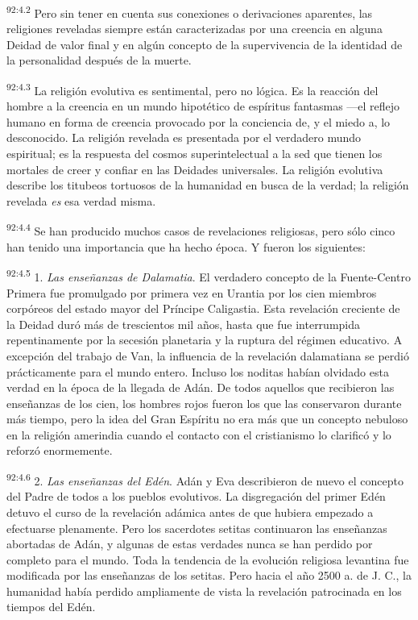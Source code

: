 \par
\textsuperscript{92:4.2} Pero sin tener en cuenta sus conexiones o derivaciones aparentes, las religiones reveladas siempre están caracterizadas por una creencia en alguna Deidad de valor final y en algún concepto de la supervivencia de la identidad de la personalidad después de la muerte.

\par
\textsuperscript{92:4.3} La religión evolutiva es sentimental, pero no lógica. Es la reacción del hombre a la creencia en un mundo hipotético de espíritus fantasmas ---el reflejo humano en forma de creencia provocado por la conciencia de, y el miedo a, lo desconocido. La religión revelada es presentada por el verdadero mundo espiritual; es la respuesta del cosmos superintelectual a la sed que tienen los mortales de creer y confiar en las Deidades universales. La religión evolutiva describe los titubeos tortuosos de la humanidad en busca de la verdad; la religión revelada \textit{es} esa verdad misma.

\par
\textsuperscript{92:4.4} Se han producido muchos casos de revelaciones religiosas, pero sólo cinco han tenido una importancia que ha hecho época. Y fueron los siguientes:

\par
\textsuperscript{92:4.5} 1. \textit{Las enseñanzas de Dalamatia}. El verdadero concepto de la Fuente-Centro Primera fue promulgado por primera vez en Urantia por los cien miembros corpóreos del estado mayor del Príncipe Caligastia. Esta revelación creciente de la Deidad duró más de trescientos mil años, hasta que fue interrumpida repentinamente por la secesión planetaria y la ruptura del régimen educativo. A excepción del trabajo de Van, la influencia de la revelación dalamatiana se perdió prácticamente para el mundo entero. Incluso los noditas habían olvidado esta verdad en la época de la llegada de Adán. De todos aquellos que recibieron las enseñanzas de los cien, los hombres rojos fueron los que las conservaron durante más tiempo, pero la idea del Gran Espíritu no era más que un concepto nebuloso en la religión amerindia cuando el contacto con el cristianismo lo clarificó y lo reforzó enormemente.

\par
\textsuperscript{92:4.6} 2. \textit{Las enseñanzas del Edén}. Adán y Eva describieron de nuevo el concepto del Padre de todos a los pueblos evolutivos. La disgregación del primer Edén detuvo el curso de la revelación adámica antes de que hubiera empezado a efectuarse plenamente. Pero los sacerdotes setitas continuaron las enseñanzas abortadas de Adán, y algunas de estas verdades nunca se han perdido por completo para el mundo. Toda la tendencia de la evolución religiosa levantina fue modificada por las enseñanzas de los setitas. Pero hacia el año 2500 a. de J. C., la humanidad había perdido ampliamente de vista la revelación patrocinada en los tiempos del Edén.

